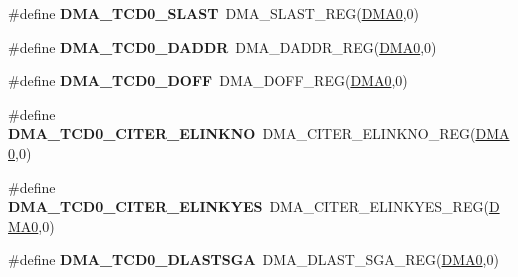 \begin{DoxyCompactItemize}
\item 
\#define {\bfseries D\+M\+A\+\_\+\+T\+C\+D0\+\_\+\+S\+L\+A\+ST}~D\+M\+A\+\_\+\+S\+L\+A\+S\+T\+\_\+\+R\+EG(\hyperlink{group__DMA__Peripheral__Access__Layer_ga4103044f9ca209772f513dc694513ffb}{D\+M\+A0},0)\hypertarget{group__DMA__Register__Accessor__Macros_ga5e23f24daf65d1eb0e6839272544261a}{}\label{group__DMA__Register__Accessor__Macros_ga5e23f24daf65d1eb0e6839272544261a}

\item 
\#define {\bfseries D\+M\+A\+\_\+\+T\+C\+D0\+\_\+\+D\+A\+D\+DR}~D\+M\+A\+\_\+\+D\+A\+D\+D\+R\+\_\+\+R\+EG(\hyperlink{group__DMA__Peripheral__Access__Layer_ga4103044f9ca209772f513dc694513ffb}{D\+M\+A0},0)\hypertarget{group__DMA__Register__Accessor__Macros_gaaa3f8d47687e097095364c5ecccf58c9}{}\label{group__DMA__Register__Accessor__Macros_gaaa3f8d47687e097095364c5ecccf58c9}

\item 
\#define {\bfseries D\+M\+A\+\_\+\+T\+C\+D0\+\_\+\+D\+O\+FF}~D\+M\+A\+\_\+\+D\+O\+F\+F\+\_\+\+R\+EG(\hyperlink{group__DMA__Peripheral__Access__Layer_ga4103044f9ca209772f513dc694513ffb}{D\+M\+A0},0)\hypertarget{group__DMA__Register__Accessor__Macros_ga660879131747c3bd7f21daa0a826b016}{}\label{group__DMA__Register__Accessor__Macros_ga660879131747c3bd7f21daa0a826b016}

\item 
\#define {\bfseries D\+M\+A\+\_\+\+T\+C\+D0\+\_\+\+C\+I\+T\+E\+R\+\_\+\+E\+L\+I\+N\+K\+NO}~D\+M\+A\+\_\+\+C\+I\+T\+E\+R\+\_\+\+E\+L\+I\+N\+K\+N\+O\+\_\+\+R\+EG(\hyperlink{group__DMA__Peripheral__Access__Layer_ga4103044f9ca209772f513dc694513ffb}{D\+M\+A0},0)\hypertarget{group__DMA__Register__Accessor__Macros_gaf189723f0b4d98fffdf6860fcb74177d}{}\label{group__DMA__Register__Accessor__Macros_gaf189723f0b4d98fffdf6860fcb74177d}

\item 
\#define {\bfseries D\+M\+A\+\_\+\+T\+C\+D0\+\_\+\+C\+I\+T\+E\+R\+\_\+\+E\+L\+I\+N\+K\+Y\+ES}~D\+M\+A\+\_\+\+C\+I\+T\+E\+R\+\_\+\+E\+L\+I\+N\+K\+Y\+E\+S\+\_\+\+R\+EG(\hyperlink{group__DMA__Peripheral__Access__Layer_ga4103044f9ca209772f513dc694513ffb}{D\+M\+A0},0)\hypertarget{group__DMA__Register__Accessor__Macros_ga9402d88f1a2681a38ed38bfdb2a94969}{}\label{group__DMA__Register__Accessor__Macros_ga9402d88f1a2681a38ed38bfdb2a94969}

\item 
\#define {\bfseries D\+M\+A\+\_\+\+T\+C\+D0\+\_\+\+D\+L\+A\+S\+T\+S\+GA}~D\+M\+A\+\_\+\+D\+L\+A\+S\+T\+\_\+\+S\+G\+A\+\_\+\+R\+EG(\hyperlink{group__DMA__Peripheral__Access__Layer_ga4103044f9ca209772f513dc694513ffb}{D\+M\+A0},0)\hypertarget{group__DMA__Register__Accessor__Macros_gaca4ffe01080735f9e83554fde2f73148}{}\label{group__DMA__Register__Accessor__Macros_gaca4ffe01080735f9e83554fde2f73148}


\end{DoxyCompactItemize}
